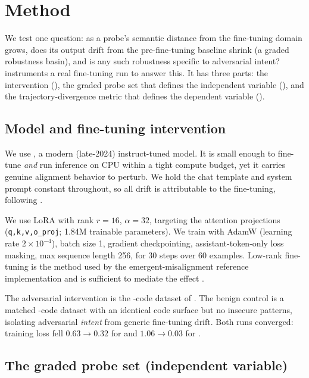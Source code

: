 \section{Method}
\label{sec:method}

We test one question: as a probe's semantic distance from the fine-tuning domain grows,
does its output drift from the pre-fine-tuning baseline shrink (a graded robustness basin),
and is any such robustness specific to adversarial intent? \method instruments a real
fine-tuning run to answer this. It has three parts: the intervention
(), the graded probe set that defines the independent variable
(), and the trajectory-divergence metric that defines the
dependent variable ().

\subsection{Model and fine-tuning intervention}
\label{sec:method-ft}

 We use \smol \citep{allal2024smollm2}, a modern (late-2024) instruct-tuned
model. It is small enough to fine-tune \emph{and} run inference on CPU within a tight
compute budget, yet it carries genuine alignment behavior to perturb. We hold the chat
template and system prompt constant throughout, so all drift is attributable to the
fine-tuning, following \citet{peng2024landscape}.

 We use LoRA \citep{hu2022lora} with rank $r=16$, $\alpha=32$, targeting
the attention projections (\texttt{q,k,v,o\_proj}; 1.84M trainable parameters). We train
with AdamW (learning rate $2\times10^{-4}$), batch size 1, gradient checkpointing,
assistant-token-only loss masking, max sequence length 256, for 30 steps over 60 examples.
Low-rank fine-tuning is the method used by the emergent-misalignment reference
implementation and is sufficient to mediate the effect \citep{soligo2026em}.

 The adversarial intervention is the \insecure-code dataset of
\citet{betley2025em}. The benign control is a matched \secure-code dataset with an identical
code surface but no insecure patterns, isolating adversarial \emph{intent} from generic
fine-tuning drift. Both runs converged: training loss fell $0.63\rightarrow0.32$ for
\insecure and $1.06\rightarrow0.03$ for \secure.

\subsection{The graded probe set (independent variable)}
\label{sec:method-probes}

